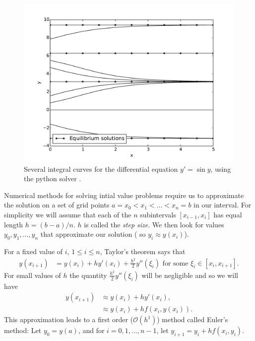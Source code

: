 \begin{figure}
\centering
\includegraphics[width=\textwidth]{Fig2.pdf}
\caption{Several integral curves for the differential equation $y' =\sin y$, using the python solver . }
\label{ivp:int_curves}
\end{figure}



Numerical methods for solving intial value problems require us to approximate the solution on a set of grid points $a = x_0< x_1<\hdots< x_n = b$ in our interval.  For simplicity we will assume that each of the $n$ subintervals $[x_{i-1},x_i]$ has equal length $h = (b-a)/n$. $h$ is called the \textit{step size}. We then look for values $y_0,y_1, \hdots, y_n$ that approximate our solution ( so $y_i \approx y(x_i)$).  

For a fixed value of $i$, $ 1 \leq i \leq n$, Taylor's theorem says that 
\begin{align*}
y(x_{i+1}) &= y(x_{i}) + h y'(x_i) + \frac{h^2}{2} y''(\xi_i)\text{ for some }\xi_i \in [x_i,x_{i+1}].
\end{align*}
For small values of $h$ the quantity $\frac{h^2}{2} y''(\xi_i)$ will be negligible and so we will have
\begin{align*}
y(x_{i+1}) &\approx y(x_{i}) + h y'(x_i)  ,\\
&\approx y(x_{i}) + h f(x_i,y(x_i)).
\end{align*}
This approximation leads to a first order ($\mathcal{O}(h^1)$) method called Euler's method: Let $y_0 = y(a)$, and for $i = 0, 1, \hdots, n-1$, let $y_{i+1} = y_i +hf(x_i,y_i)$. 

